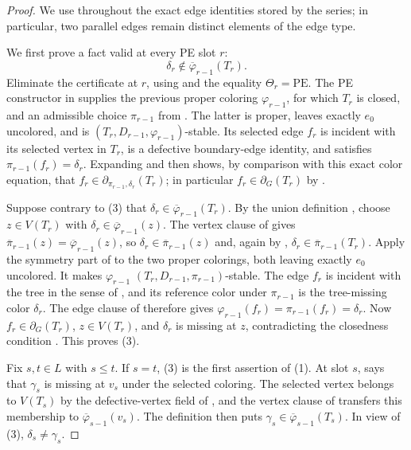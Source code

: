 \begin{proof}
We use throughout the exact edge identities stored by the series; in
particular, two parallel edges remain distinct elements of the edge type.

We first prove a fact valid at every PE slot \(r\):
\[
                  \delta_r\notin
                  \overline\varphi_{r-1}(T_r).                 \tag{3}
\]
Eliminate the certificate at \(r\), using  and
the equality \(\Theta_r=\mathrm{PE}\).  The PE constructor in
 supplies the previous proper coloring
\(\varphi_{r-1}\), for which \(T_r\) is closed, and an admissible choice
\(\pi_{r-1}\) from .  The latter is
proper, leaves exactly \(e_0\) uncolored, and is
\((T_r,D_{r-1},\varphi_{r-1})\)-stable.  Its selected edge \(f_r\) is
incident with its selected vertex in \(T_r\), is a defective boundary-edge
identity, and satisfies \(\pi_{r-1}(f_r)=\delta_r\).  Expanding
 and then  shows, by
comparison with this exact color equation, that
\(f_r\in\partial_{\pi_{r-1},\delta_r}(T_r)\); in particular
\(f_r\in\partial_G(T_r)\) by .

Suppose contrary to (3) that
\(\delta_r\in\overline\varphi_{r-1}(T_r)\).  By the union definition
, choose \(z\in V(T_r)\) with
\(\delta_r\in\overline\varphi_{r-1}(z)\).  The vertex clause of
 gives
\(\overline\pi_{r-1}(z)=\overline\varphi_{r-1}(z)\), so
\(\delta_r\in\overline\pi_{r-1}(z)\) and, again by
,
\(\delta_r\in\overline\pi_{r-1}(T_r)\).  Apply the symmetry part of
 to the two proper colorings, both leaving exactly \(e_0\)
uncolored.  It makes \(\varphi_{r-1}\)
\((T_r,D_{r-1},\pi_{r-1})\)-stable.  The edge \(f_r\) is incident with
the tree in the sense of , and its reference
color under \(\pi_{r-1}\) is the tree-missing color \(\delta_r\).
The edge clause of  therefore gives
\(\varphi_{r-1}(f_r)=\pi_{r-1}(f_r)=\delta_r\).  Now
\(f_r\in\partial_G(T_r)\), \(z\in V(T_r)\), and \(\delta_r\) is missing
at \(z\), contradicting the closedness condition
.  This proves (3).

Fix \(s,t\in L\) with \(s\leq t\).  If \(s=t\), (3) is the first
assertion of (1).  At slot \(s\),  says
that \(\gamma_s\) is missing at \(v_s\) under the selected coloring.
The selected vertex belongs to \(V(T_s)\) by the defective-vertex field of
, and the vertex clause of
 transfers this membership to
\(\overline\varphi_{s-1}(v_s)\).  The definition
 then puts
\(\gamma_s\in\overline\varphi_{s-1}(T_s)\).  In view of (3),
\(\delta_s\ne\gamma_s\).


\end{proof}
